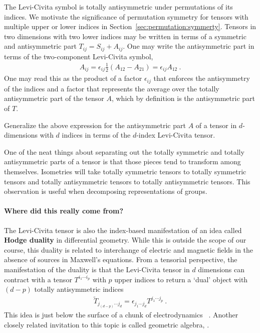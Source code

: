 The Levi-Civita symbol is totally antisymmetric under permutations of its indices. We motivate the significance of permutation symmetry for tensors with multiple upper or lower indices in Section~\ref{sec:permutation:symmerty}. Tensors in two dimensions with two lower indices may be written in terms of a symmetric and antisymmetric part $T_{ij}= S_{ij} + A_{ij}$. One may write the antisymmetric part in terms of the two-component Levi-Civita symbol,
\begin{align}
    A_{ij} = \epsilon_{ij} \frac{1}{2} \left(A_{12}-A_{21}\right)
    =\epsilon_{ij} A_{12}
     \ .
    \label{eq:antisymmetric:wrt:levi:civita}
\end{align}
One may read this as the product of a factor $\epsilon_{ij}$ that enforces the antisymmetry of the indices and a factor that represents the average over the totally antisymmetric part of the tensor $A$, which by definition is the antisymmetric part of $T$.
\begin{exercise}
Generalize the above expression for the antisymmetric part $A$ of a tensor in $d$-dimensions with $d$ indices in terms of the $d$-index Levi-Civita tensor.
\end{exercise}
One of the neat things about separating out the totally symmetric and totally antisymmetric parts of a tensor is that those pieces tend to transform among themselves. Isometries will take totally symmetric tensors to totally symmetric tensors and totally antisymmetric tensors to totally antisymmetric tensors. This observation is useful when decomposing representations of groups.

\paragraph{Where did this really come from?}
% 
The Levi-Civita tensor is also the index-based manifestation of an idea called \textbf{Hodge duality} in differential geometry. While this is outside the scope of our course, this duality is related to interchange of electric and magnetic fields in the absence of sources in Maxwell's equations. From a tensorial perspective, the manifestation of the duality is that the Levi-Civita tensor in $d$ dimensions can contract with a tensor $T^{i_1\cdots i_p}$ with $p$ upper indices to return a `dual' object with $(d-p)$ totally antisymmetric indices
\begin{align}
   \tilde T_{j_{(d-p)}\cdots j_{d}} 
   = 
   \epsilon_{j_1 \cdots j_d}  T^{j_1 \cdots j_p} \ .
   \label{eq:Hodge:duality:epsilon}
\end{align}
This idea is just below the surface of a chunk of electrodynamics
~\autocite{Fumeron:2020bjj}. Another closely related invitation to this topic is called geometric algebra, \autocite{Doran:2007tqa}.

